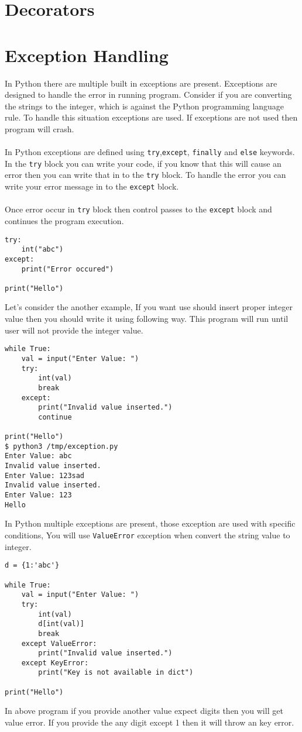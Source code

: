 \documentclass[letterpaper,12pt]{book}
\begin{document}
\section{Decorators}

\section{Exception Handling}
In Python there are multiple built in exceptions are present. Exceptions are designed to handle the error in running program. Consider if you are converting the strings to the integer, which is against the Python programming language rule. To handle this situation exceptions are used. If exceptions are not used then program will crash.
\paragraph{}
In Python exceptions are defined using \texttt{try},\texttt{except}, \texttt{finally} and \texttt{else} keywords. In the \texttt{try} block you can write your code, if you know that this will cause an error then you can write that in to the \texttt{try} block. To handle the error you can write your error message in to the \texttt{except} block.
\paragraph{}
Once error occur in \texttt{try} block then control passes to the \texttt{except} block and continues the program execution.
\begin{lstlisting}
try:
    int("abc")
except:
    print("Error occured")

print("Hello")
\end{lstlisting}

Let's consider the another example, If you want use should insert proper integer value then you should write it using following way. This program will run until user will not provide the integer value.
\begin{lstlisting}
while True:
    val = input("Enter Value: ")
    try:
        int(val)
        break
    except:
        print("Invalid value inserted.")
        continue

print("Hello")
$ python3 /tmp/exception.py
Enter Value: abc
Invalid value inserted.
Enter Value: 123sad
Invalid value inserted.
Enter Value: 123
Hello
\end{lstlisting}

In Python multiple exceptions are present, those exception are used with specific conditions, You will use \texttt{ValueError} exception when convert the string value to integer.
\begin{lstlisting}
d = {1:'abc'}

while True:
    val = input("Enter Value: ")
    try:
        int(val)
        d[int(val)]
        break
    except ValueError:
        print("Invalid value inserted.")
    except KeyError:
        print("Key is not available in dict")

print("Hello")
\end{lstlisting}
In above program if you provide another value expect digits then you will get value error. If you provide the any digit except 1 then it will throw an key error. 
\end{document}
